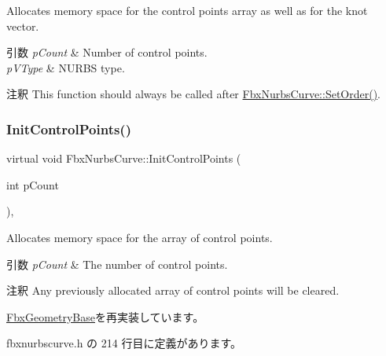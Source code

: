 Allocates memory space for the control points array as well as for the knot vector. 
\begin{DoxyParams}{引数}
{\em p\+Count} & Number of control points. \\
\hline
{\em p\+V\+Type} & N\+U\+R\+BS type. \\
\hline
\end{DoxyParams}
\begin{DoxyRemark}{注釈}
This function should always be called after \hyperlink{class_fbx_nurbs_curve_a86494a5ca4d88af6700d0d1345852736}{Fbx\+Nurbs\+Curve\+::\+Set\+Order()}. 
\end{DoxyRemark}
\mbox{\label{class_fbx_nurbs_curve_ae6a6921bd7bbe88bcda86f14e9639df0}} 
\subsubsection{\texorpdfstring{Init\+Control\+Points()}{InitControlPoints()}\hspace{0.1cm}{\footnotesize\ttfamily [2/2]}}
{\footnotesize\ttfamily virtual void Fbx\+Nurbs\+Curve\+::\+Init\+Control\+Points (\begin{DoxyParamCaption}\item[{int}]{p\+Count }\end{DoxyParamCaption})\hspace{0.3cm}{\ttfamily [inline]}, {\ttfamily [virtual]}}

Allocates memory space for the array of control points. 
\begin{DoxyParams}{引数}
{\em p\+Count} & The number of control points. \\
\hline
\end{DoxyParams}
\begin{DoxyRemark}{注釈}
Any previously allocated array of control points will be cleared. 
\end{DoxyRemark}


\hyperlink{class_fbx_geometry_base_a471b736f2595c006a338c07a61907127}{Fbx\+Geometry\+Base}を再実装しています。



 fbxnurbscurve.\+h の 214 行目に定義があります。

\mbox{\label{class_fbx_nurbs_curve_a7ccb15bbffaf02d3141ae86d10cf633d}} 
